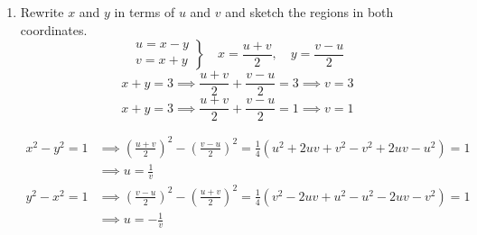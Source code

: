 \documentclass[a4paper, 12pt]{article}
\begin{document}
\begin{enumerate}[leftmargin=*,label=\textbf{\arabic*.}]
If we switch to polar coordinates, we can easily evaluate the integral.
\begin{align*}\text{Surface area}&=\int_0^{2\pi}\int_0^5\sqrt{1+4r^2}\,r\,dr\,d\theta=\int_0^{2\pi}\left[\frac1{12}\left(1+4r^2\right)^{3/2}\right]_{r=0}^{r=5}\,d\theta\\[1em]&=\frac1{12}\int_0^{2\pi}\left[\left(1+4\cdot25\right)^{3/2}-\left(1+4\cdot0\right)^{3/2}\right]\,d\theta=\frac{101^{3/2}-1}{12}\int_0^{2\pi}d\theta\\[1em]&=\boxed{\frac{101^{3/2}-1}6\cdot\pi}\end{align*}

\item Rewrite $x$ and $y$ in terms of $u$ and $v$ and sketch the regions in both coordinates.
\[
\left.
\begin{array}{c}
u=x-y\\v=x+y
\end{array}\right\}
\quad \displaystyle x=\frac{u+v}2,\quad y=\frac{v-u}2
\]
\vspace{-1em}
\[x+y=3\implies\frac{u+v}2+\frac{v-u}2=3\implies v=3\]
\[x+y=3\implies\frac{u+v}2+\frac{v-u}2=1\implies v=1\]

\begin{align*}x^2-y^2=1&\implies\left(\frac{u+v}2\right)^2-\left(\frac{v-u}2\right)^2=\frac14\left(u^2+2uv+v^2-v^2+2uv-u^2\right)=1\\[1em]&\implies u=\frac1v\end{align*}
\begin{align*}y^2-x^2=1&\implies\left(\frac{v-u}2\right)^2-\left(\frac{u+v}2\right)^2=\frac14\left(v^2-2uv+u^2-u^2-2uv-v^2\right)=1\\[1em]&\implies u=-\frac1v\end{align*}

\begin{center}
\begin{minipage}{0.45\textwidth}
\end{minipage}
\end{center}
\end{enumerate}
\end{document}

